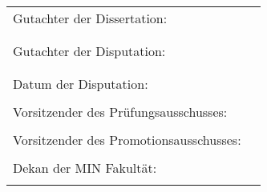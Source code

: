 \vspace{10cm}

{ \large

  \begin{tabular}{ll}

    Gutachter der Dissertation: \\%
                                \\ \\%

    Gutachter der Disputation:  \\%
                                \\ \\%

    Datum der Disputation:      \\ \\%

    Vorsitzender des Pr\"ufungsausschusses: \\ \\%

    Vorsitzender des Promotionsausschusses: \\ \\%

    Dekan der MIN Fakult\"at: \\ \\ %

  \end{tabular}
}
\clearpage